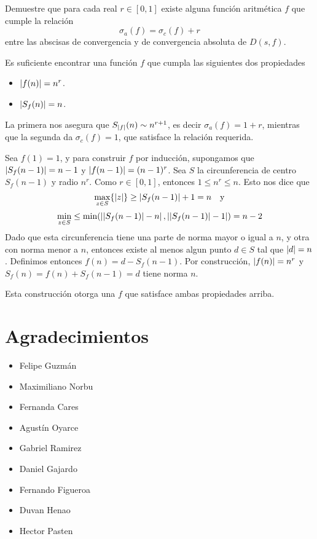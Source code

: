 \begin{prob}[3 pts.]
    Demuestre que para cada real $r\in[0,1]$ existe alguna función aritmética $f$ que cumple la relación
    \[\sigma_a(f)=\sigma_c(f)+r\]
    entre las abscisas de convergencia y de convergencia absoluta de $D(s,f)$.
\end{prob}

\begin{sol}
    Es suficiente encontrar una función $f$ que cumpla las siguientes dos propiedades
    \begin{itemize}
        \item $\left|f(n)\right| = n^r$.
        \item $\left|S_f(n)\right| = n$.
    \end{itemize}
    La primera nos asegura que $S_{\left|f\right|}(n) \sim n^{r+1}$, es decir $\sigma_a(f) = 1+r$, mientras que la segunda da $\sigma_c(f) = 1$, que satisface la relación requerida.

    Sea $f(1) = 1$, y para construir $f$ por inducción, supongamos que $\left|S_f(n-1)\right| = n-1$ y $\left|f(n-1)\right| = (n-1)^r$. Sea $S$ la circunferencia de centro $S_f(n-1)$ y radio $n^r$. Como $r \in [0,1]$, entonces $1 \leq n^r \leq n$. Esto nos dice que
    $$\max_{z \in S}\{\left|z\right|\} \geq \left|S_f(n-1)\right| + 1 = n\quad \text{y}$$
    $$\min_{z \in S} \leq \min(\left|\left|S_f(n-1)\right| - n\right|,\left|\left|S_f(n-1)\right| - 1\right|) = n-2$$
    Dado que esta circunferencia tiene una parte de norma mayor o igual a $n$, y otra con norma menor a $n$, entonces existe al menos algun punto $d \in S$ tal que $\left|d\right| = n$. Definimos entonces $f(n) = d - S_f(n-1)$. Por construcción, $\left|f(n)\right| = n^r$ y $S_f(n) = f(n) + S_f(n-1) = d$ tiene norma $n$.

    Esta construcción otorga una $f$ que satisface ambas propiedades arriba.
\end{sol}

\section{Agradecimientos}
\begin{multicols}{3}
    \begin{itemize}
        \item Felipe Guzmán

        \item Maximiliano Norbu

        \item Fernanda Cares

        \item Agustín Oyarce

        \item Gabriel Ramirez

        \item Daniel Gajardo

        \item Fernando Figueroa

        \item Duvan Henao

        \item Hector Pasten
    \end{itemize}
\end{multicols}

